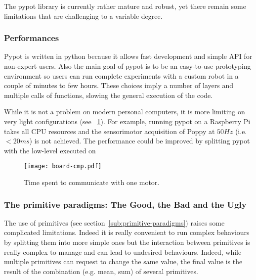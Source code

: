 The pypot library is currently rather mature and robust, yet there remain some limitations that are challenging to a variable degree.

\subsubsection{Performances}

Pypot is written in python because it allows fast development and simple API for non-expert users. Also the main goal of pypot is to be an easy-to-use prototyping environment so users can run complete experiments with a custom robot in a couple of minutes to few hours. These choices imply a number of layers and multiple calls of functions, slowing the general execution of the code.

While it is not a problem on modern personal computers, it is more limiting on very light configurations (see \figurename~\ref{fig:pypot-board-comparaison}). For example, running pypot on a Raspberry Pi takes all CPU resources and the sensorimotor acquisition of Poppy at $50Hz$ (i.e. $<20ms$) is not achieved.
The performance could be improved by splitting pypot with the low-level executed on

\begin{figure}[tb]
    \begin{center}
        \texttt{[image: board-cmp.pdf]}
    \end{center}
    \caption{Time spent to communicate with one motor.}
    \label{fig:pypot-board-comparaison}
\end{figure}

\begin{figure}[tb]
\centering
    \hfil
    \caption{}
    \label{fig:pypot-run}
\end{figure}



\subsubsection{The primitive paradigms: The Good, the Bad and the Ugly}
\label{sec:pypot-primitives-problems}

The use of primitives (see section~\ref{sub:primitive-paradigms}) raises some complicated limitations. Indeed it is really convenient to run complex behaviours by splitting them into more simple ones but the interaction between primitives is really complex to manage and can lead to undesired behaviours. Indeed, while multiple primitives can request to change the same value, the final value is the result of the combination (e.g. mean, sum) of several primitives.


